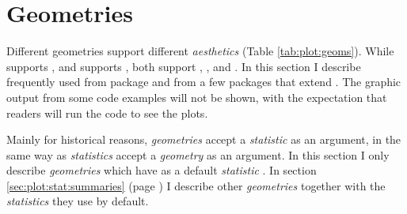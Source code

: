 \documentclass[krantz2]{krantz}\usepackage{knitr}
\begin{document}
\section{Geometries}\label{sec:plot:geometries}

Different geometries support different \emph{aesthetics} (Table \ref{tab:plot:geoms}). While  supports , and  supports , both support , ,  and . In this section I describe frequently used  from package \ggplot and from a few packages that extend \ggplot. The graphic output from some code examples will not be shown, with the expectation that readers will run the code to see the plots.

Mainly for historical reasons, \emph{geometries} accept a \emph{statistic} as an argument, in the same way as \emph{statistics} accept a \emph{geometry} as an argument. In this section I only describe \emph{geometries} which have as a default \emph{statistic} . In section \ref{sec:plot:stat:summaries} (page \pageref{sec:plot:stat:summaries}) I describe other \emph{geometries} together with the \emph{statistics} they use by default.
\end{document}
